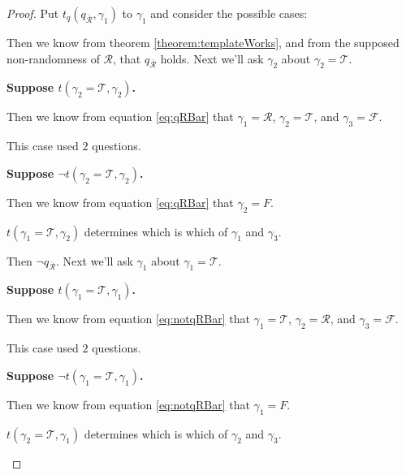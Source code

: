 \documentclass[twoside,twocolumn,a4paper,11pt]{article}
\theoremstyle{definition}
\begin{document}
\begin{proof}
Put $t_q(q_{\bar{\mathcal{R}}},\gamma_1)$ to $\gamma_1$ and consider the possible cases:

\begin{description}[itemsep=2pt,topsep=1pt,leftmargin=1.1em]
\item[Case \(t(q_{\bar{\mathcal{R}}},\gamma_1)\):] \hspace{0.0em}Then we know
 from theorem \ref{theorem:templateWorks}, and from the supposed non-randomness of $\mathcal{R}$,
 that $q_{\bar{\mathcal{R}}}$ holds.
 Next we'll ask $\gamma_2$ about $\gamma_2=\mathcal{T}$.
 
 \textbf{Suppose $t(\gamma_2=\mathcal{T},\gamma_2)$.}
 
 Then we know from equation \eqref{eq:qRBar} that
 $\gamma_1=\mathcal{R}$, $\gamma_2=\mathcal{T}$, and $\gamma_3=\mathcal{F}$.
 
 This case used $2$ questions.
 
 \textbf{Suppose $\neg t(\gamma_2=\mathcal{T},\gamma_2)$.}
 
 Then we know from equation \eqref{eq:qRBar} that $\gamma_2=F$.
 
 $t(\gamma_1=\mathcal{T},\gamma_2)$ determines which is which of $\gamma_1$ and $\gamma_3$.

\item[Case \(\neg t(q_{\bar{\mathcal{R}}},\gamma_1)\):] \hspace{0.0em}Then 
 $\neg q_{\bar{\mathcal{R}}}$.
 Next we'll ask $\gamma_1$ about $\gamma_1=\mathcal{T}$.
 
 \textbf{Suppose $t(\gamma_1=\mathcal{T},\gamma_1)$.}
 
 Then we know from equation \eqref{eq:notqRBar} that
 $\gamma_1=\mathcal{T}$, $\gamma_2=\mathcal{R}$, and $\gamma_3=\mathcal{F}$.
 
 This case used $2$ questions.
 
 \textbf{Suppose $\neg t(\gamma_1=\mathcal{T},\gamma_1)$.}
 
 Then we know from equation \eqref{eq:notqRBar} that $\gamma_1=F$.
 
 $t(\gamma_2=\mathcal{T},\gamma_1)$ determines which is which of $\gamma_2$ and $\gamma_3$.
\end{description}
\vspace{-0.65em}
\end{proof}
\vspace{-0.90em}
\end{document}
